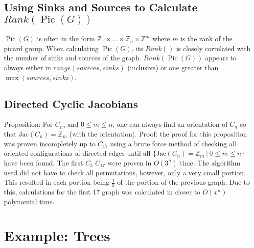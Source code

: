 \documentclass[11pt,reqno]{amsart}
\DeclareMathOperator{\Pic}{Pic}
\newcommand{\Jac}{\textrm{Jac}}{}
\theoremstyle{definition}
\theoremstyle{plain}
\begin{document}
	\subsection{Using Sinks and Sources to Calculate $Rank(\Pic(G))$}
		$\Pic(G)$ is often in the form $\mathbb{Z}_1 \times \dots \times \mathbb{Z}_n \times \mathbb{Z}^m$ where $m$ is
		the rank of the picard group.  When calculating $\Pic(G)$, its $Rank()$ is closely correlated with the number of sinks
		and sources of the graph.  $Rank(\Pic(G))$ appears to always either in $range(sources, sinks)$ (inclusive) or
		one greater than $\max(sources, sinks)$.
	\subsection{Directed Cyclic Jacobians}
		Proposition: For $C_n$, and $0 \leq m \leq n$, one can always find an orientation of $C_n$ so
		that $\Jac(C_n)=\mathbb{Z}_m$ (with the orientation).
		Proof: the proof for this proposition was proven incompletely up to $C_{17}$ using a brute force method of checking
		all oriented configurations of directed edges until all $\{\Jac(C_n)=\mathbb{Z}_m~|~0 \leq m \leq n\}$ have been found.
		The first $C_3$ $C_{17}$ were proven in $O(3^n)$ time.  The algorithm used did not have to check all permutations, however,
		only a very cmall portion.  This resulted in each portion being $\frac{1}{3}$ of the portion of the previous graph.
		Due to this, calculations for the first 17 graph was calculated in closer to $O(x^n)$ polynomial time.

\section{Example: Trees}
\end{document}
